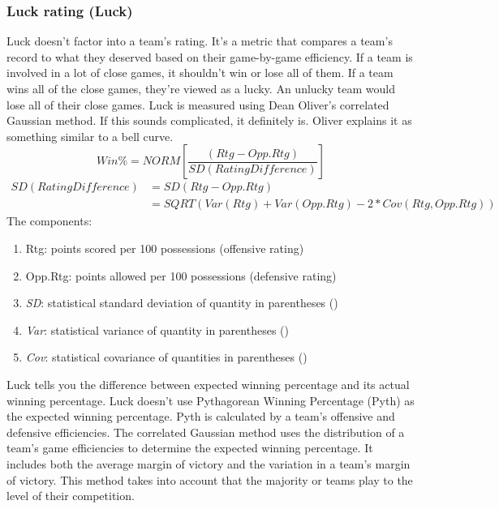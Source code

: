 \documentclass[
10pt, %
a4paper, %
oneside, %
headinclude,footinclude, %
BCOR5mm, %
]{scrartcl}
\begin{document}
\subsubsection{Luck rating (Luck)}
Luck doesn't factor into a team's rating. It's a metric that compares a team's record to what they deserved based on their game-by-game efficiency.
If a team is involved in a lot of close games, it shouldn't win or lose all of them. If a team wins all of the close games, they're viewed as a lucky. An unlucky team would lose all of their close games.
Luck is measured using Dean Oliver's correlated Gaussian method.
If this sounds complicated, it definitely is.
Oliver explains it as something similar to a bell curve.
\begin{equation}
Win\% = \mathit{NORM}\left [ \frac{\left (Rtg-Opp.Rtg \right )}{\mathit{SD}\left ( Rating Difference \right )} \right ]
\end{equation}
\begin{equation}
\begin{split}
\mathit{SD}\left(Rating Difference\right) & = \mathit{SD}\left(Rtg - Opp.Rtg\right)  \\
							& = \mathit{SQRT}\left(\mathit{Var}\left(Rtg\right)+\mathit{Var}\left(Opp.Rtg\right) - 2*\mathit{Cov}\left(Rtg,Opp.Rtg\right)\right)
\end{split}
\end{equation}
The components:
\begin{enumerate}
\item Rtg: points scored per 100 possessions (offensive rating)
\item Opp.Rtg: points allowed per 100 possessions (defensive rating)
\item \textit{SD}: statistical standard deviation of quantity in parentheses ()
\item \textit{Var}: statistical variance of quantity in parentheses ()
\item \textit{Cov}: statistical covariance of quantities in parentheses ()
\end{enumerate}

Luck tells you the difference between expected winning percentage and its actual winning percentage.
Luck doesn't use Pythagorean Winning Percentage (Pyth) as the expected winning percentage. Pyth is calculated by a team's offensive and defensive efficiencies.
The correlated Gaussian method uses the distribution of a team's game efficiencies to determine the expected winning percentage. It includes both the average margin of victory and the variation in a team's margin of victory.
This method takes into account that the majority or teams play to the level of their competition.
\end{document}

